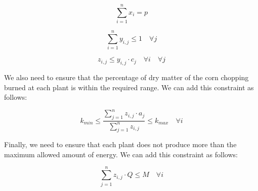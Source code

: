 \documentclass{article}
\begin{document}
$$\sum_{i=1}^n x_i = p$$

$$\sum_{i=1}^n y_{i,j} \leq 1 \quad \forall j$$

$$ z_{i,j} \leq y_{i,j} \cdot c_j \quad \forall i \quad \forall j$$

We also need to ensure that the percentage of dry matter of the corn chopping burned at each plant is within the required range. We can add this constraint as follows:

$$k_{min} \leq \frac{\sum_{j=1}^n z_{i,j} \cdot a_j}{\sum_{j=1}^n z_{i,j}} \leq k_{max} \quad \forall i$$

Finally, we need to ensure that each plant does not produce more than the maximum allowed amount of energy. We can add this constraint as follows:

$$\sum_{j=1}^n z_{i,j} \cdot Q \leq M \quad \forall i$$
\end{document}
